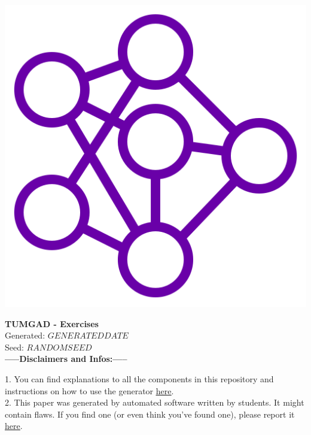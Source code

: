\documentclass[12pt]{article}
\begin{document}
    \begin{center}
        \includegraphics[scale=0.25]{favicon.png} %
        \vspace{15px}

        {\selectfont
            \textbf{\LARGE{TUMGAD - Exercises}}\\
            Generated: $GENERATEDDATE$\\
            Seed: $RANDOMSEED$\\
        }
        \vspace{20px}
        \textbf{\LARGE{-----Disclaimers and Infos:-----}}
        \\[0.2in]
    \end{center}
    1. You can find explanations to all the components in this repository and instructions on how to use the generator \href{https://ossner.github.io/TUMGAD/src/routes}{\underline{here}}.
    \\[0.2in]
    2. This paper was generated by automated software written by students.
    It might contain flaws.
    If you find one (or even think you've found one), please report it \href{https://github.com/ossner/TUMGAD/issues/new?assignees=&labels=&template=bug_report.md&title=}{\underline{here}}.
    \\[0.2in]
\end{document}
